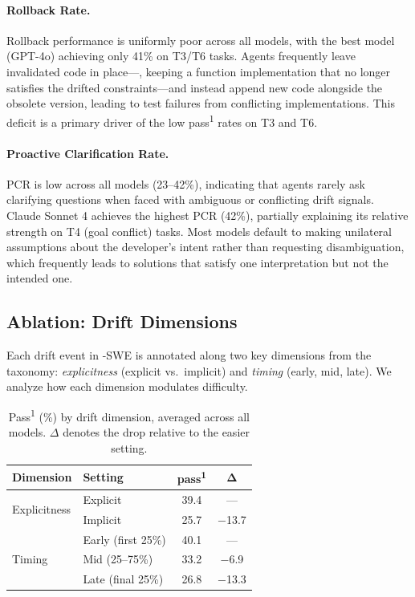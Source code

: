 \paragraph{Rollback Rate.}
Rollback performance is uniformly poor across all models, with the best model (GPT-4o) achieving only 41\% on T3/T6 tasks. Agents frequently leave invalidated code in place---\eg, keeping a function implementation that no longer satisfies the drifted constraints---and instead append new code alongside the obsolete version, leading to test failures from conflicting implementations. This deficit is a primary driver of the low pass\textsuperscript{1} rates on T3 and T6.

\paragraph{Proactive Clarification Rate.}
PCR is low across all models (23--42\%), indicating that agents rarely ask clarifying questions when faced with ambiguous or conflicting drift signals. Claude Sonnet 4 achieves the highest PCR (42\%), partially explaining its relative strength on T4 (goal conflict) tasks. Most models default to making unilateral assumptions about the developer's intent rather than requesting disambiguation, which frequently leads to solutions that satisfy one interpretation but not the intended one.

\subsection{Ablation: Drift Dimensions}
\label{sec:ablation-dimensions}

Each drift event in \bench{}-SWE is annotated along two key dimensions from the taxonomy: \emph{explicitness} (explicit vs.\ implicit) and \emph{timing} (early, mid, late). We analyze how each dimension modulates difficulty.

\begin{table}[t]
\centering
\caption{Pass\textsuperscript{1} (\%) by drift dimension, averaged across all models. $\Delta$ denotes the drop relative to the easier setting.}
\label{tab:ablation-dimensions}
\small
\begin{tabular}{ll cc}
\toprule
\textbf{Dimension} & \textbf{Setting} & \textbf{pass\textsuperscript{1}} & $\boldsymbol{\Delta}$ \\
\midrule
\multirow{2}{*}{Explicitness} & Explicit & 39.4 & --- \\
                               & Implicit & 25.7 & $-$13.7 \\
\midrule
\multirow{3}{*}{Timing}       & Early (first 25\%) & 40.1 & --- \\
                               & Mid (25--75\%) & 33.2 & $-$6.9 \\
                               & Late (final 25\%) & 26.8 & $-$13.3 \\
\bottomrule
\end{tabular}
\end{table}

